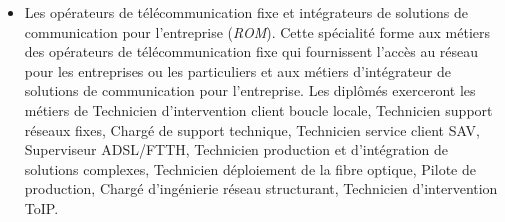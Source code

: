 \begin{itemize}[leftmargin=5ex]
	\item Les opérateurs de télécommunication fixe et intégrateurs de solutions de communication pour l'entreprise ({\em ROM}). Cette spécialité forme aux métiers des opérateurs de télécommunication fixe qui fournissent l'accès au réseau pour les entreprises ou les particuliers et aux métiers d'intégrateur de solutions de communication pour l'entreprise. Les diplômés exerceront les métiers de Technicien d’intervention client boucle locale, Technicien support réseaux fixes, Chargé de support technique, Technicien service client SAV, Superviseur ADSL/FTTH, Technicien production et d'intégration de solutions complexes, Technicien déploiement de la fibre optique, Pilote de production, Chargé d'ingénierie réseau structurant, Technicien d’intervention ToIP.
\end{itemize}